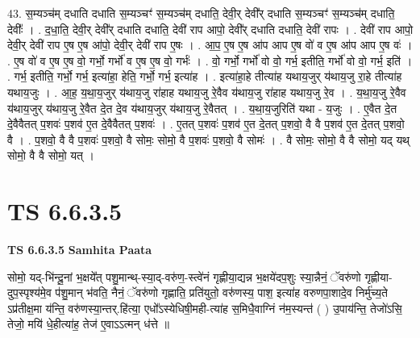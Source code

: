 \documentclass[17pt]{extarticle}
\begin{document}
43. स॒म्यञ्च॑म् दधाति दधाति स॒म्यञ्चꣳ॑ स॒म्यञ्च॑म् दधाति॒ देवी॒र् देवी᳚र् दधाति स॒म्यञ्चꣳ॑ स॒म्यञ्च॑म् दधाति॒ देवीः᳚ । . द॒धा॒ति॒ देवी॒र् देवी᳚र् दधाति दधाति॒ देवी॑ राप आपो॒ देवी᳚र् दधाति दधाति॒ देवी॑ रापः । . देवी॑ राप आपो॒ देवी॒र् देवी॑ राप ए॒ष ए॒ष आ॑पो॒ देवी॒र् देवी॑ राप ए॒षः । . आ॒प॒ ए॒ष ए॒ष आ॑प आप ए॒ष वो॑ व ए॒ष आ॑प आप ए॒ष वः॑ । . ए॒ष वो॑ व ए॒ष ए॒ष वो॒ गर्भो॒ गर्भो॑ व ए॒ष ए॒ष वो॒ गर्भः॑ । . वो॒ गर्भो॒ गर्भो॑ वो वो॒ गर्भ॒ इतीति॒ गर्भो॑ वो वो॒ गर्भ॒ इति॑ । . गर्भ॒ इतीति॒ गर्भो॒ गर्भ॒ इत्या॑हा॒ हेति॒ गर्भो॒ गर्भ॒ इत्या॑ह । . इत्या॑हा॒हे तीत्या॑ह यथाय॒जुर् य॑थाय॒जु रा॒हे तीत्या॑ह यथाय॒जुः । . आ॒ह॒ य॒था॒य॒जुर् य॑थाय॒जु रा॑हाह यथाय॒जु रे॒वैव य॑थाय॒जु रा॑हाह यथाय॒जु रे॒व । . य॒था॒य॒जु रे॒वैव य॑थाय॒जुर् य॑थाय॒जु रे॒वैत दे॒त दे॒व य॑थाय॒जुर् य॑थाय॒जु रे॒वैतत् । . य॒था॒य॒जुरिति॑ यथा - य॒जुः । . ए॒वैत दे॒त दे॒वैवैतत् प॒शवः॑ प॒शव॑ ए॒त दे॒वैवैतत् प॒शवः॑ । . ए॒तत् प॒शवः॑ प॒शव॑ ए॒त दे॒तत् प॒शवो॒ वै वै प॒शव॑ ए॒त दे॒तत् प॒शवो॒ वै । . प॒शवो॒ वै वै प॒शवः॑ प॒शवो॒ वै सोमः॒ सोमो॒ वै प॒शवः॑ प॒शवो॒ वै सोमः॑ । . वै सोमः॒ सोमो॒ वै वै सोमो॒ यद् यथ् सोमो॒ वै वै सोमो॒ यत् । \newline
\pagebreak
{}

\section{ TS 6.6.3.5 }

\textbf{TS 6.6.3.5 } \newline
\textbf{Samhita Paata} \newline

सोमो॒ यद्-भि॑न्दू॒नां भ॒क्षये᳚त् पशु॒मान्थ्-स्या॒द्-वरु॑ण॒-स्त्वे॑नं गृह्णीया॒द्यन्न भ॒क्षये॑दप॒शुः स्या॒न्नैनं॒ ॅवरु॑णो गृह्णीया-दुप॒स्पृश्य॑मे॒व प॑शु॒मान् भ॑वति॒ नैनं॒ ॅवरु॑णो गृह्णाति॒ प्रति॑युतो॒ वरु॑णस्य॒ पाश॒ इत्या॑ह वरुणपा॒शादे॒व निर्मु॑च्य॒ते ऽप्र॑तीक्ष॒मा य॑न्ति॒ वरु॑णस्या॒न्तर्.हि॑त्या॒ एधो᳚ऽस्येधिषी॒मही-त्या॑ह स॒मिधै॒वाग्निं न॑म॒स्यन्त॑ ( ) उ॒पाय॑न्ति॒ तेजो॑ऽसि॒ तेजो॒ मयि॑ धे॒हीत्या॑ह॒ तेज॑ ए॒वाऽऽत्मन् ध॑त्ते ॥ \newline
\end{document}
